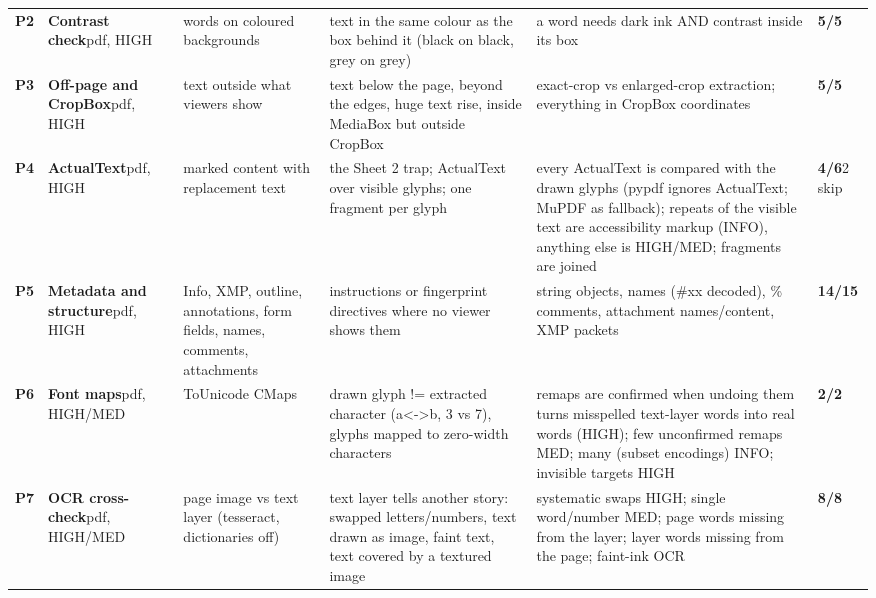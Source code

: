 \documentclass[10pt,a4paper]{article}
\begin{document}
\begin{longtable}{@{}P{0.6cm}P{2.6cm}P{3.1cm}P{4.4cm}P{4.4cm}P{1.4cm}@{}}
\textbf{P2} & \textbf{Contrast check}\newline\footnotesize pdf, HIGH & \footnotesize words on coloured backgrounds & \footnotesize text in the same colour as the box behind it (black on black, grey on grey) & \footnotesize a word needs dark ink AND contrast inside its box & \textcolor{ok}{\textbf{5/5}}\\
\textbf{P3} & \textbf{Off-page and CropBox}\newline\footnotesize pdf, HIGH & \footnotesize text outside what viewers show & \footnotesize text below the page, beyond the edges, huge text rise, inside MediaBox but outside CropBox & \footnotesize exact-crop vs enlarged-crop extraction; everything in CropBox coordinates & \textcolor{ok}{\textbf{5/5}}\\
\textbf{P4} & \textbf{ActualText}\newline\footnotesize pdf, HIGH & \footnotesize marked content with replacement text & \footnotesize the Sheet 2 trap; ActualText over visible glyphs; one fragment per glyph & \footnotesize every ActualText is compared with the drawn glyphs (pypdf ignores ActualText; MuPDF as fallback); repeats of the visible text are accessibility markup (INFO), anything else is HIGH/MED; fragments are joined & \textcolor{ok}{\textbf{4/6}}\newline\footnotesize 2 skip\\
\textbf{P5} & \textbf{Metadata and structure}\newline\footnotesize pdf, HIGH & \footnotesize Info, XMP, outline, annotations, form fields, names, comments, attachments & \footnotesize instructions or fingerprint directives where no viewer shows them & \footnotesize string objects, names (\#xx decoded), \% comments, attachment names/content, XMP packets & \textcolor{bad}{\textbf{14/15}}\\
\textbf{P6} & \textbf{Font maps}\newline\footnotesize pdf, HIGH/MED & \footnotesize ToUnicode CMaps & \footnotesize drawn glyph != extracted character (a\textless{}-\textgreater{}b, 3 vs 7), glyphs mapped to zero-width characters & \footnotesize remaps are confirmed when undoing them turns misspelled text-layer words into real words (HIGH); few unconfirmed remaps MED; many (subset encodings) INFO; invisible targets HIGH & \textcolor{ok}{\textbf{2/2}}\\
\textbf{P7} & \textbf{OCR cross-check}\newline\footnotesize pdf, HIGH/MED & \footnotesize page image vs text layer (tesseract, dictionaries off) & \footnotesize text layer tells another story: swapped letters/numbers, text drawn as image, faint text, text covered by a textured image & \footnotesize systematic swaps HIGH; single word/number MED; page words missing from the layer; layer words missing from the page; faint-ink OCR & \textcolor{ok}{\textbf{8/8}}\\

\end{longtable}
\end{document}
